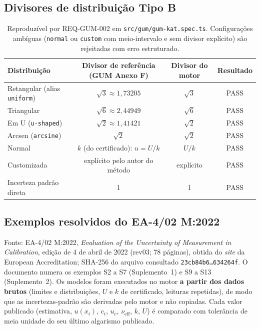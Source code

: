 \documentclass[11pt,a4paper]{article}
\begin{document}
\subsection{Divisores de distribuição Tipo B}

\begin{table}[H]
  \centering
  \small
  \begin{tabularx}{\textwidth}{l c c c}
    \toprule
    \textbf{Distribuição} & \textbf{Divisor de referência (GUM Anexo F)} & \textbf{Divisor do motor} & \textbf{Resultado} \\
    \midrule
    Retangular (alias \texttt{uniform}) & \(\sqrt{3} \approx 1{,}73205\)   & \(\sqrt{3}\)   & PASS \\
    Triangular                          & \(\sqrt{6} \approx 2{,}44949\)   & \(\sqrt{6}\)   & PASS \\
    Em U (\texttt{u-shaped})            & \(\sqrt{2} \approx 1{,}41421\)   & \(\sqrt{2}\)   & PASS \\
    Arcsen (\texttt{arcsine})           & \(\sqrt{2}\)                     & \(\sqrt{2}\)   & PASS \\
    Normal                              & \(k\) (do certificado): \(u = U/k\) & \(U/k\)     & PASS \\
    Customizada                         & explícito pelo autor do método   & explícito      & PASS \\
    Incerteza padrão direta             & 1                                & 1              & PASS \\
    \bottomrule
  \end{tabularx}
  \caption*{\small Reproduzível por REQ-GUM-002 em \texttt{src/gum/gum-kat.spec.ts}. Configurações ambíguas (\texttt{normal} ou \texttt{custom} com meio-intervalo e sem divisor explícito) são rejeitadas com erro estruturado.}
\end{table}

\subsection{Exemplos resolvidos do EA-4/02 M:2022}
\label{sec:ea402}

Fonte: EA-4/02 M:2022, \emph{Evaluation of the Uncertainty of Measurement in Calibration}, edição de 4 de abril de 2022 (rev03; 78 páginas), obtida do \emph{site} da European Accreditation; SHA-256 do arquivo consultado \texttt{23cb84b6\ldots 634264f}. O documento numera os exemplos S2 a S7 (Suplemento~1) e S9 a S13 (Suplemento~2). Os modelos foram executados no motor \textbf{a partir dos dados brutos} (limites e distribuições, \(U\) e \(k\) de certificado, leituras repetidas), de modo que as incertezas-padrão são derivadas pelo motor e não copiadas. Cada valor publicado (estimativa, \(u(x_i)\), \(c_i\), \(u_c\), \(\nu_{\text{eff}}\), \(k\), \(U\)) é comparado com tolerância de meia unidade do seu último algarismo publicado.
\end{document}
